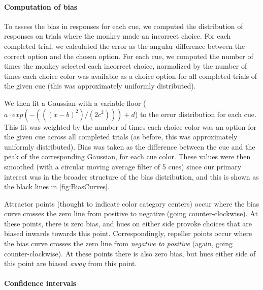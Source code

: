 
\paragraph{Computation of bias} To assess the bias in responses for each cue, we computed the distribution of responses on trials where the monkey made an incorrect choice.
For each completed trial, we calculated the error as the angular difference between the correct option and the chosen option.  
For each cue, we computed the number of times the monkey selected each incorrect choice, normalized by the number of times each choice color was available as a choice option for all completed trials of the given cue (this was approximately uniformly distributed).

We then fit a Gaussian with a variable floor ($a \cdot exp(-(((x-b)^2)/(2c^2)))+d$) to the error distribution for each cue. 
This fit was weighted by the number of times each choice color was an option for the given cue across all completed trials (as before, this was approximately uniformly distributed). 
Bias was taken as the difference between the cue and the peak of the corresponding Gaussian, for each cue color. These values were then smoothed (with a circular moving average filter of 5 cues) since our primary interest was in the broader structure of the bias distribution, and this is shown as the black lines in \autoref{fig:BiasCurves}.

Attractor points (thought to indicate color category centers) occur where the bias curve crosses the zero line from positive to negative (going counter-clockwise).
At these points, there is zero bias, and hues on either side provoke choices that are biased inwards towards this point.
Correspondingly, repeller points occur where the bias curve crosses the zero line from \emph{negative to positive} (again, going counter-clockwise).
At these points there is also zero bias, but hues either side of this point are biased \emph{away} from this point.

\paragraph{Confidence intervals}

